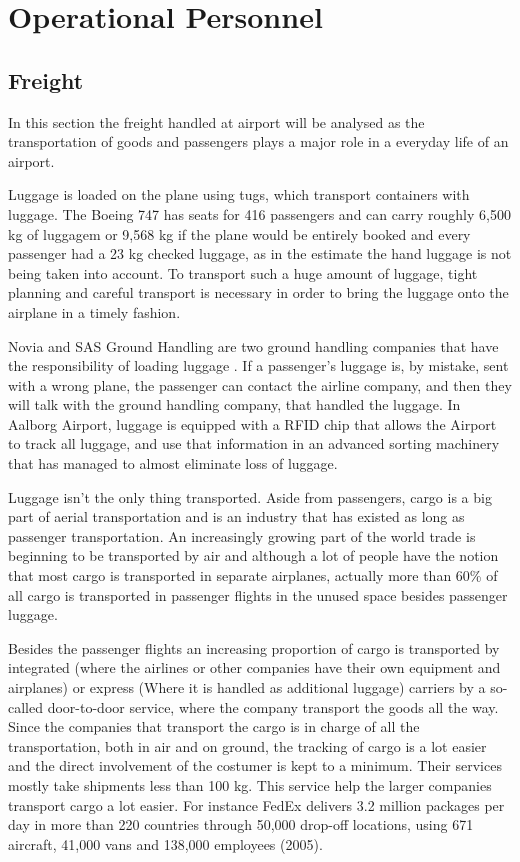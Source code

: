 \section{Operational Personnel}
\subsection{Freight}
In this section the freight handled at airport will be analysed as the transportation of goods and passengers plays a major role in a everyday life of an airport. 

Luggage is loaded on the plane using tugs, which transport containers with luggage. The Boeing 747 has seats for 416 passengers\cite{freight_boing} and can carry roughly 6,500 kg of luggagem or 9,568 kg if the plane would be entirely booked and every passenger had a 23 kg checked luggage, as in the estimate the hand luggage is not being taken into account. To transport such a huge amount of luggage, tight planning and careful transport is necessary in order to bring the luggage onto the airplane in a timely fashion.

Novia and SAS Ground Handling are two ground handling companies that have the responsibility of loading luggage \cite{mistet_bagage}. If a passenger's luggage is, by mistake, sent with a wrong plane, the passenger can contact the airline company, and then they will talk with the ground handling company, that handled the luggage. In Aalborg Airport, luggage is equipped with a RFID chip that allows the Airport to track all luggage, and use that information in an advanced sorting machinery that has managed to almost eliminate loss of luggage.


Luggage isn't the only thing transported. Aside from passengers, cargo is a big part of aerial transportation and is an industry that has existed as long as passenger transportation. An increasingly growing part of the world trade is beginning to be transported by air and although a lot of people have the notion that most cargo is transported in separate airplanes, actually more than 60\% of all cargo is transported in passenger flights in the unused space besides passenger luggage. %


Besides the passenger flights an increasing proportion of cargo is transported by integrated (where the airlines or other companies have their own equipment and airplanes) or express (Where it is handled as additional luggage) 
carriers by a so-called door-to-door service, where the company transport the goods all the way. Since the companies that transport the cargo is in charge of all the transportation, both in air and on ground, the tracking of cargo is a lot easier and the direct involvement of the costumer is kept to a minimum. Their services mostly take shipments less than 100 kg. This service help the larger companies transport cargo a lot easier. For instance FedEx delivers 3.2 million packages per day in more than 220 countries through 50,000 drop-off locations, using 671 aircraft, 41,000 vans and 138,000 employees (2005). %

